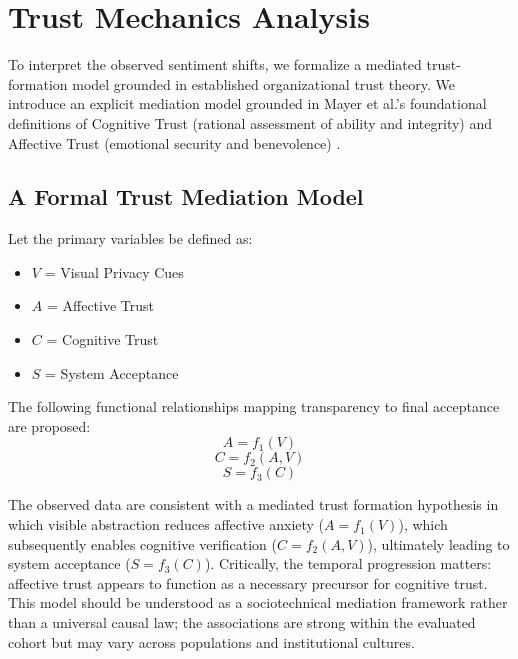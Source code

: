 \documentclass[conference]{IEEEtran}
\begin{document}
\section{Trust Mechanics Analysis}

To interpret the observed sentiment shifts, we formalize a mediated trust-formation model grounded in established organizational trust theory. We introduce an explicit mediation model grounded in Mayer et al.'s foundational definitions of Cognitive Trust (rational assessment of ability and integrity) and Affective Trust (emotional security and benevolence) \cite{b6}.

\subsection{A Formal Trust Mediation Model}

Let the primary variables be defined as:
\begin{itemize}
    \item $V$ = Visual Privacy Cues
    \item $A$ = Affective Trust
    \item $C$ = Cognitive Trust
    \item $S$ = System Acceptance
\end{itemize}

The following functional relationships mapping transparency to final acceptance are proposed:
\begin{equation}
A = f_1(V)
\end{equation}
\begin{equation}
C = f_2(A,V)
\end{equation}
\begin{equation}
S = f_3(C)
\end{equation}

The observed data are consistent with a mediated trust formation hypothesis in which visible abstraction reduces affective anxiety ($A = f_1(V)$), which subsequently enables cognitive verification ($C = f_2(A, V)$), ultimately leading to system acceptance ($S = f_3(C)$). Critically, the temporal progression matters: affective trust appears to function as a necessary precursor for cognitive trust. This model should be understood as a sociotechnical mediation framework rather than a universal causal law; the associations are strong within the evaluated cohort but may vary across populations and institutional cultures.
\end{document}
